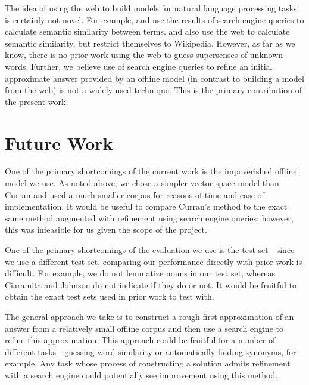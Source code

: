 \documentclass{article}
\begin{document}

The idea of using the web to build models for natural language processing tasks is certainly not novel.
For example, \cite{bollegala} and \cite{gracia} use the results of search engine queries to calculate semantic similarity between terms.
\cite{strube} and \cite{gabrilovich} also use the web to calculate semantic similarity, but restrict themselves to Wikipedia.
However, as far as we know, there is no prior work using the web to guess supersenses of unknown words.
Further, we believe use of search engine queries to refine an initial approximate answer provided by an offline model (in contrast to building a model from the web) is not a widely used technique.
This is the primary contribution of the present work.

\section{Future Work}


One of the primary shortcomings of the current work is the impoverished offline model we use.
As noted above, we chose a simpler vector space model than Curran \cite{curran} and used a much smaller corpus for reasons of time and ease of implementation.
It would be useful to compare Curran's method to the exact same method augmented with refinement using search engine queries; however, this was infeasible for us given the scope of the project.

One of the primary shortcomings of the evaluation we use is the test set---since we use a different test set, comparing our performance directly with prior work is difficult.
For example, we do not lemmatize nouns in our test set, whereas Ciaramita and Johnson \cite{cj} do not indicate if they do or not.
It would be fruitful to obtain the exact test sets used in prior work to test with.

The general approach we take is to construct a rough first approximation of an answer from a relatively small offline corpus and then use a search engine to refine this approximation.
This approach could be fruitful for a number of different tasks---guessing word similarity or automatically finding synonyms, for example.
Any task whose process of constructing a solution admits refinement with a search engine  could potentially see improvement using this method.
\end{document}
